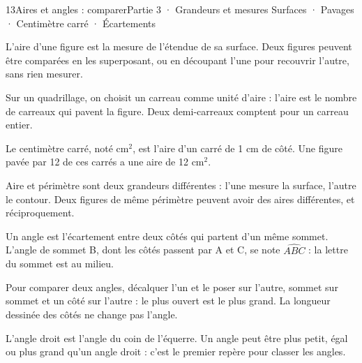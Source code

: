 \begin{ouverture}[grandeurs]{13}{Aires et angles : comparer}{Partie 3 · Grandeurs et mesures}
{Surfaces · Pavages · Centimètre carré · Écartements}
\end{ouverture}
\pagestyle{otMain}\essentiel\fontsize{11}{15}\selectfont
{}\label{cours-13-1}
\begin{definition}L’aire d’une figure est la mesure de l’étendue de sa surface. Deux figures peuvent être comparées en les superposant, ou en découpant l’une pour recouvrir l’autre, sans rien mesurer.\end{definition}
\begin{savoirfaire}Sur un quadrillage, on choisit un carreau comme unité d’aire : l’aire est le nombre de carreaux qui pavent la figure. Deux demi-carreaux comptent pour un carreau entier.\end{savoirfaire}
\begin{definition}Le centimètre carré, noté $\mathrm{cm}^2$, est l’aire d’un carré de 1 cm de côté. Une figure pavée par 12 de ces carrés a une aire de 12 $\mathrm{cm}^2$.\end{definition}
\begin{attention}Aire et périmètre sont deux grandeurs différentes : l’une mesure la surface, l’autre le contour. Deux figures de même périmètre peuvent avoir des aires différentes, et réciproquement.\end{attention}
\clearpage
{}\label{cours-13-2}
\begin{definition}Un angle est l’écartement entre deux côtés qui partent d’un même sommet. L’angle de sommet B, dont les côtés passent par A et C, se note $\widehat{ABC}$ : la lettre du sommet est au milieu.\end{definition}
\label{fig-cours-13-2-cours-angles}

\begin{savoirfaire}Pour comparer deux angles, décalquer l’un et le poser sur l’autre, sommet sur sommet et un côté sur l’autre : le plus ouvert est le plus grand. La longueur dessinée des côtés ne change pas l’angle.\end{savoirfaire}
\begin{propriete}L’angle droit est l’angle du coin de l’équerre. Un angle peut être plus petit, égal ou plus grand qu’un angle droit : c’est le premier repère pour classer les angles.\end{propriete}

